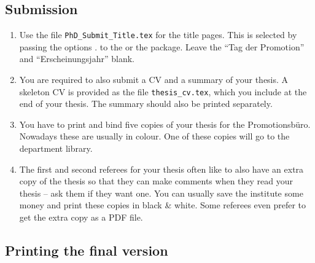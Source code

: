 \subsection{Submission}

\begin{enumerate}
\item Use the file \texttt{PhD\_Submit\_Title.tex} for the title
  pages. 
  This is selected by passing the options .
  to the  or the  package.
  Leave the \foreignquote{ngerman}{Tag der Promotion} and
  \foreignquote{ngerman}{Erscheinungsjahr} blank.
\item You are required to also submit a CV and a summary of your
  thesis. A skeleton CV is provided as the file
  \texttt{thesis\_cv.tex}, which you include at the end of your
  thesis. The summary should also be printed separately.
\item You have to print and bind five copies of your thesis for the
  \foreignlanguage{ngerman}{Promotionsbüro}. Nowadays these are
  usually in colour.
  One of these copies will go to the department library.
\item The first and second referees for your thesis often like to also
  have an extra copy of the thesis so that they can make comments when they read
  your thesis -- ask them if they want one. You can usually save the
  institute some money and print these copies in black \& white.
  Some referees even prefer to get the extra copy as a PDF file.
\end{enumerate}


\subsection{Printing the final version}

